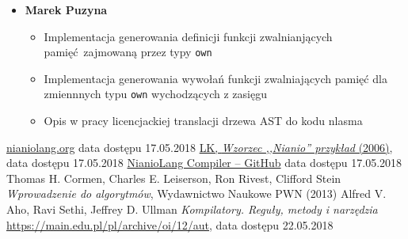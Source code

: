 \documentclass[licencjacka]{pracamgr}
\begin{document}
\begin{itemize}
  \item[] \textbf{Marek Puzyna}
  \begin{itemize}
   \item Implementacja generowania definicji funkcji zwalnianjących pamięć zajmowaną przez typy \texttt{own}
   \item Implementacja generowania wywołań funkcji zwalniających pamięć dla zmiennnych typu \texttt{own} wychodzących
     z zasięgu
   \item Opis w pracy licencjackiej translacji drzewa AST do kodu nlasma
  \end{itemize}
\end{itemize}


\appendix

\begin{thebibliography}{99}

 \href{http://www.nianiolang.org}{nianiolang.org} data dostępu 17.05.2018
 \href{https://www.mimuw.edu.pl/~chrzaszc/BPJ20067/nianio.pdf}{LK, \textit{Wzorzec ,,Nianio'' przykład} (2006)}, data dostępu 17.05.2018
 \href{https://github.com/nianiolang/nl}{NianioLang Compiler -- GitHub}
data dostępu 17.05.2018
 Thomas H. Cormen, Charles E. Leiserson, Ron Rivest, Clifford Stein \textit{Wprowadzenie do algorytmów}, Wydawnictwo Naukowe PWN (2013)
 Alfred V. Aho, Ravi Sethi, Jeffrey D. Ullman \textit{Kompilatory. Reguły, metody i narzędzia}
\href{https://main.edu.pl/pl/archive/oi/12/aut}{https://main.edu.pl/pl/archive/oi/12/aut},
data dostępu 22.05.2018


\end{thebibliography}
\end{document}
